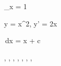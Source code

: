 \lim_{x }  = 1 %

y = x^2, y' = 2x %

\int {}\,dx = \log \lvert x \rvert + c %

\subset, \supset, \cup, \cap, \in, \notin, \setminus, \emptyset %
